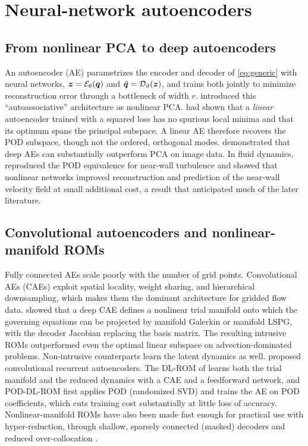 \section{Neural-network autoencoders}
\label{sec:autoencoders}

\subsection{From nonlinear PCA to deep autoencoders}

An autoencoder (AE) parametrizes the encoder and decoder of \eqref{eq:generic}
with neural networks, $\bm{z}=\mathcal{E}_{\theta}(\bm{q})$ and $\hat{\bm{q}}=\mathcal{D}_{\vartheta}(\bm{z})$,
and trains both jointly to minimize reconstruction error through a bottleneck
of width $r$. \textcite{kramer1991nlpca} introduced this ``autoassociative''
architecture as nonlinear PCA. \textcite{baldi1989} had shown that a
\emph{linear} autoencoder trained with a squared loss has no spurious local
minima and that its optimum spans the principal subspace. A linear AE therefore
recovers the POD subspace, though not the ordered, orthogonal modes.
\textcite{hinton2006reducing} demonstrated that deep AEs can substantially
outperform PCA on image data. In fluid dynamics, \textcite{milano2002}
reproduced the POD equivalence for near-wall turbulence and showed that
nonlinear networks improved reconstruction and prediction of the near-wall
velocity field at small additional cost, a result that anticipated much of the
later literature.

\subsection{Convolutional autoencoders and nonlinear-manifold ROMs}

Fully connected AEs scale poorly with the number of grid points. Convolutional
AEs (CAEs) exploit spatial locality, weight sharing, and hierarchical
downsampling, which makes them the dominant architecture for gridded flow data.
\textcite{lee2020cae} showed that a deep CAE defines a nonlinear trial manifold
onto which the governing equations can be projected by manifold Galerkin or
manifold LSPG, with the decoder Jacobian replacing the basis matrix. The
resulting intrusive ROMs outperformed even the optimal linear subspace on
advection-dominated problems. Non-intrusive counterparts learn the latent
dynamics as well. \textcite{gonzalez2018deep} proposed convolutional recurrent
autoencoders. The DL-ROM of \textcite{fresca2021dlrom} learns both the trial
manifold and the reduced dynamics with a CAE and a feedforward network, and
POD-DL-ROM \parencite{fresca2022poddlrom} first applies POD (randomized SVD)
and trains the AE on POD coefficients, which cuts training cost substantially
at little loss of accuracy. Nonlinear-manifold ROMs have also been made fast
enough for practical use with hyper-reduction, through shallow, sparsely
connected (masked) decoders \parencite{kim2022shallow} and reduced
over-collocation \parencite{romor2023overcollocation}.

